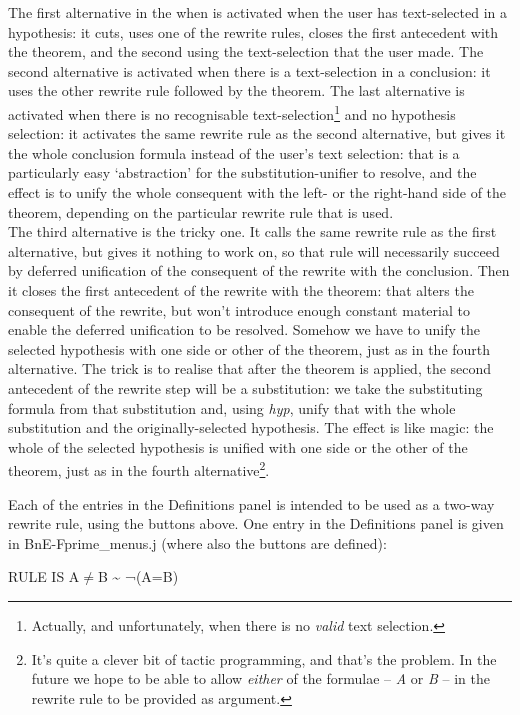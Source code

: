 \documentclass[11pt]{book}
\begin{document}
The first alternative in the when is activated when the user has text-selected in a hypothesis: it cuts, uses one of the rewrite rules, closes the first antecedent with the theorem, and the second using the text-selection that the user made. The second alternative is activated when there is a text-selection in a conclusion: it uses the other rewrite rule followed by the theorem. The last alternative is activated when there is no recognisable text-selection\footnote{Actually, and unfortunately, when there is no \textit{valid} text selection.} and no hypothesis selection: it activates the same rewrite rule as the second alternative, but gives it the whole conclusion formula instead of the user's text selection: that is a particularly easy `abstraction' for the substitution-unifier to resolve, and the effect is to unify the whole consequent with the left- or the right-hand side of the theorem, depending on the particular rewrite rule that is used.\\
The third alternative is the tricky one. It calls the same rewrite rule as the first alternative, but gives it nothing to work on, so that rule will necessarily succeed by deferred unification of the consequent of the rewrite with the conclusion. Then it closes the first antecedent of the rewrite with the theorem: that alters the consequent of the rewrite, but won't introduce enough constant material to enable the deferred unification to be resolved. Somehow we have to unify the selected hypothesis with one side or other of the theorem, just as in the fourth alternative. The trick is to realise that after the theorem is applied, the second antecedent of the rewrite step will be a substitution: we take the substituting formula from that substitution and, using \textit{hyp}, unify that with the whole substitution and the originally-selected hypothesis. The effect is like magic: the whole of the selected hypothesis is unified with one side or the other of the theorem, just as in the fourth alternative\footnote{It's quite a clever bit of tactic programming, and that's the problem. In the future we hope to be able to allow \textit{either} of the formulae -- \textit{A} or \textit{B} -- in the rewrite rule to be provided as argument.}.


Each of the entries in the Definitions panel is intended to be used as a two-way rewrite rule, using the buttons above. One entry in the Definitions panel is given in BnE-Fprime\_menus.j (where also the buttons are defined):

RULE IS A\ensuremath{\neq}B \~{} ¬(A=B)
\end{document}
